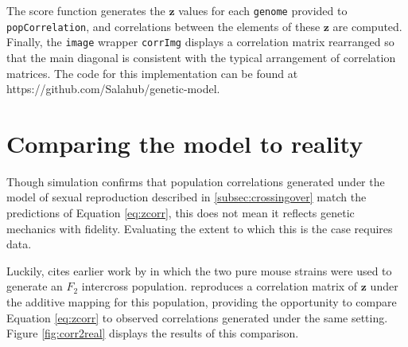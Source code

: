 \documentclass{article}
\newcommand{\code}[1]{\texttt{#1}}
\newcommand{\ve}[1]{\mathbf{#1}}           %
\begin{document}
The score function generates the $\ve{z}$ values for each \code{genome} provided to \code{popCorrelation}, and correlations between the elements of these $\ve{z}$ are computed. Finally, the \code{image} wrapper \code{corrImg} displays a correlation matrix rearranged so that the main diagonal is consistent with the typical arrangement of correlation matrices. The code for this implementation can be found at https://github.com/Salahub/genetic-model.

\section{Comparing the model to reality} \label{sec:model2real}

Though simulation confirms that population correlations generated under the model of sexual reproduction described in \ref{subsec:crossingover} match the predictions of Equation \ref{eq:zcorr}, this does not mean it reflects genetic mechanics with fidelity. Evaluating the extent to which this is the case requires data.

Luckily, \cite{cheverud2001} cites earlier work by \cite{cheverudetal2001} in which the two pure mouse strains were used to generate an $F_2$ intercross population. \cite{cheverud2001} reproduces a correlation matrix of $\ve{z}$ under the additive mapping for this population, providing the opportunity to compare Equation \ref{eq:zcorr} to observed correlations generated under the same setting. Figure \ref{fig:corr2real} displays the results of this comparison.
\end{document}
